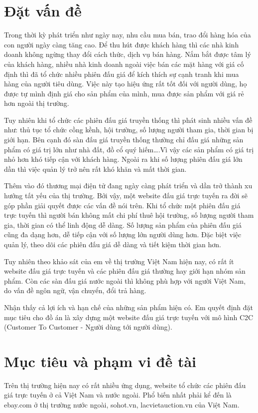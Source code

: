 \documentclass[../DoAn.tex]{subfiles}
\begin{document}
\section{Đặt vấn đề}
\label{section:1.1}
Trong thời kỳ phát triển như ngày nay, nhu cầu mua bán, trao đổi hàng hóa của con người ngày càng tăng cao. Để thu hút được khách hàng thì các nhà kinh doanh không ngừng thay đổi cách thức, dịch vụ bán hàng. Nắm bắt được tâm lý của khách hàng, nhiều nhà kinh doanh ngoài việc bán các mặt hàng với giá cố định thì đã tổ chức nhiều phiên đấu giá để kích thích sự cạnh tranh khi mua hàng của người tiêu dùng. Việc này tạo hiệu ứng rất tốt đối với người dùng, họ được tự mình định giá cho sản phẩm của mình, mua được sản phẩm với giá rẻ hơn ngoài thị trường. 

Tuy nhiên khi tổ chức các phiên đấu giá truyền thống thì phát sinh nhiều vấn đề như: thủ tục tổ chức cồng kềnh, hội trường, số lượng người tham gia, thời gian bị giới hạn. Bên cạnh đó sàn đấu giá truyền thống thường chỉ đấu giá những sản phẩm có giá trị lớn như nhà đất, đồ cổ quý hiếm….Vì vậy các sản phẩm có giá trị nhỏ hơn khó tiếp cận với khách hàng. Ngoài ra khi số lượng phiên đấu giá lớn dần thì việc quản lý trở nên rất khó khăn và mất thời gian.

Thêm vào đó thương mại điện tử đang ngày càng phát triển và dần trở thành xu hướng tất yếu của thị trường. Bởi vậy, một website đấu giá trực tuyến ra đời sẽ góp phần giải quyết được các vấn đề nói trên. Khi tổ chức một phiên đấu giá trực tuyến thì người bán không mất chi phí thuê hội trường, số lượng người tham gia, thời gian có thể linh động dễ dàng. Số lượng sản phẩm của phiên đấu giá cũng đa dạng hơn, dễ tiếp cận với số lượng lớn người dùng hơn. Đặc biệt việc quản lý, theo dõi các phiên đấu giá dễ dàng và tiết kiệm thời gian hơn.

Tuy nhiên theo khảo sát của em về thị trường Việt Nam hiện nay, có rất ít website đấu giá trực tuyến và các phiên đấu giá thường hay giới hạn nhóm sản phẩm. Còn các sàn đấu giá nước ngoài thì không phù hợp với người Việt Nam, do vấn đề ngôn ngữ, vận chuyển, đổi trả hàng.

Nhận thấy cả lợi ích và hạn chế của những sản phẩm hiện có. Em quyết định đặt mục tiêu cho đồ án là xây dựng một website đấu giá trực tuyến với mô hình C2C (Customer To Customer - Người dùng tới người dùng).
\section{Mục tiêu và phạm vi đề tài}
\label{section:1.2}
Trên thị trường hiện nay có rất nhiều ứng dụng, website tổ chức các phiên đấu giá trực tuyến ở cả Việt Nam và nước ngoài. Phổ biến nhất phải kể đến là ebay.com  ở thị trường nước ngoài, sohot.vn, lacvietauction.vn của Việt Nam.
\end{document}
